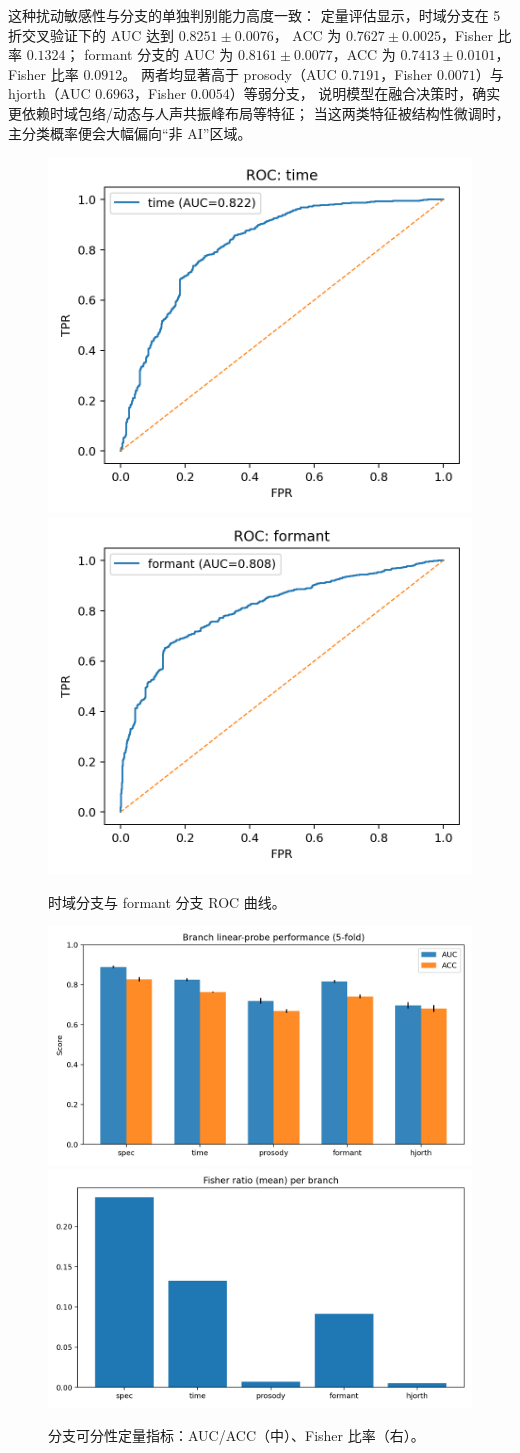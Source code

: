 \documentclass[a4paper,12pt]{article}
\begin{document}
这种扰动敏感性与分支的单独判别能力高度一致：
定量评估显示，时域分支在 5 折交叉验证下的 AUC 达到 $0.8251\!\pm\!0.0076$，
ACC 为 $0.7627\!\pm\!0.0025$，Fisher 比率 $0.1324$；
formant 分支的 AUC 为 $0.8161\!\pm\!0.0077$，ACC 为 $0.7413\!\pm\!0.0101$，
Fisher 比率 $0.0912$。
两者均显著高于 prosody（AUC $0.7191$，Fisher $0.0071$）与 hjorth（AUC $0.6963$，Fisher $0.0054$）等弱分支，
说明模型在融合决策时，确实更依赖时域包络/动态与人声共振峰布局等特征；
当这两类特征被结构性微调时，主分类概率便会大幅偏向“非 AI”区域。

\begin{figure}[H]
  \centering
  \includegraphics[width=.45\linewidth]{images_in_paper/roc_time.png}
  \includegraphics[width=.45\linewidth]{images_in_paper/roc_formant.png}
  \caption{时域分支与 formant 分支 ROC 曲线。}
  \label{fig:roc}
\end{figure}

\begin{figure}[H]
  \centering
  \includegraphics[width=.32\linewidth]{images_in_paper/branch_metrics_auc_acc.png}
  \includegraphics[width=.32\linewidth]{images_in_paper/branch_fisher.png}
  \caption{分支可分性定量指标：AUC/ACC（中）、Fisher 比率（右）。}
  \label{fig:branch_silhouette}
  \label{fig:branch_aucacc}
  \label{fig:branch_fisher}
\end{figure}
\end{document}
